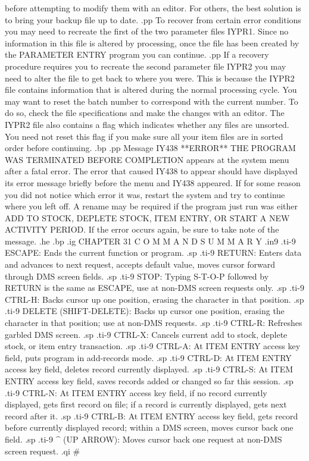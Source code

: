 before attempting to modify them with an editor.
For others, the best solution is to
bring your backup file up to date.
.pp
To recover from certain error conditions you may need to recreate the first of
the two parameter files IYPR1.	Since no information in this file is
altered by processing, once the file has been created by the PARAMETER ENTRY
program you can continue.
.pp
If a recovery procedure requires you to recreate the second parameter file
IYPR2 you may need to alter the file to get back to where you were.  This
is because the IYPR2 file contains information that is altered during the
normal processing cycle.  You may want to reset the batch number to
correspond with the current number.  To do so, check the file specifications
and make the changes with an editor. The IYPR2 file also contains a
flag which indicates whether any files are unsorted.  You need not reset this
flag if you make sure all your item files are in sorted order before
continuing.
.bp
.pp
Message IY438 **ERROR** THE PROGRAM WAS TERMINATED BEFORE COMPLETION appears
at the system menu after a fatal error.  The error that caused IY438 to
appear should have displayed its error message briefly before the menu and
IY438 appeared.  If for some reason you did not notice which error it was,
restart the system and try to continue where you left off.  A rename may be
required if the program just run was either ADD TO STOCK, DEPLETE STOCK,
ITEM ENTRY, OR START A NEW ACTIVITY PERIOD.
If the error
occurs again, be sure to take note of the message.
.he
.bp
.ig
CHAPTER 31
C O M M A N D	 S U M M A R Y
.in9
.ti-9
ESCAPE:  Ends the current function or program.
.sp
.ti-9
RETURN:  Enters data and advances to next request, accepts default value,
moves cursor forward through DMS screen fields.
.sp
.ti-9
STOP:	 Typing S-T-O-P followed by RETURN is the same as ESCAPE, use at
non-DMS screen requests only.
.sp
.ti-9
CTRL-H:  Backs cursor up one position, erasing the character in that position.
.sp
.ti-9
DELETE (SHIFT-DELETE):	Backs up cursor one position, erasing the character
in that position; use at non-DMS requests.
.sp
.ti-9
CTRL-R:  Refreshes garbled DMS screen.
.sp
.ti-9
CTRL-X:  Cancels current add to stock, deplete stock, or item entry
transaction.
.sp
.ti-9
CTRL-A:  At ITEM ENTRY access key field, puts program in add-records mode.
.sp
.ti-9
CTRL-D:  At ITEM ENTRY access key field, deletes record currently displayed.
.sp
.ti-9
CTRL-S:  At ITEM ENTRY access key field, saves records added or changed so
far this session.
.sp
.ti-9
CTRL-N:  At ITEM ENTRY access key field, if no record currently displayed,
gets first record on file; if a record is currently displayed, gets next
record after it.
.sp
.ti-9
CTRL-B:  At ITEM ENTRY access key field, gets record before currently
displayed record; within a DMS screen, moves cursor back one field.
.sp
.ti-9
^ (UP ARROW):  Moves cursor back one request at non-DMS screen request.
.qi
#
